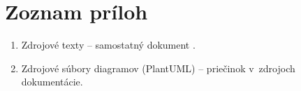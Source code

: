 \documentclass[11pt, a4paper]{article}
\begin{document}
\section{Zoznam príloh}

\begin{enumerate}[label=Príloha \Alph*:, leftmargin=*]
  \item Zdrojové texty – samostatný dokument .
  \item Zdrojové súbory diagramov (PlantUML) – priečinok  v~zdrojoch dokumentácie.
\end{enumerate}
\end{document}

